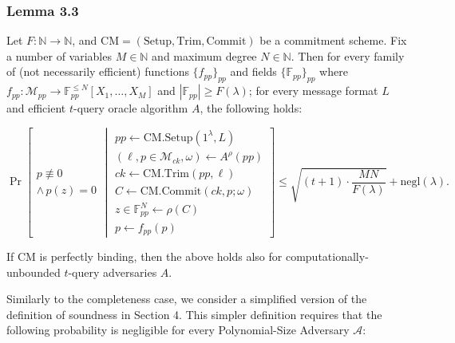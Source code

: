 \documentclass[
]{article}
\author{}
\date{2025-01-29 - 10:45:02 UTC}
\newcommand*\Ac{\mathcal{A}}
\begin{document}
\subsubsection{Lemma 3.3}\label{lemma-3.3}

Let \(F: \mathbb{N} \to \mathbb{N}\), and
\(\text{CM} = (\text{Setup}, \text{Trim}, \text{Commit})\) be a
commitment scheme. Fix a number of variables \(M \in \mathbb{N}\) and
maximum degree \(N \in \mathbb{N}\). Then for every family of (not
necessarily efficient) functions \(\{f_{pp}\}_{pp}\) and fields
\(\{\mathbb{F}_{pp}\}_{pp}\) where
\(f_{pp}: \mathcal{M}_{pp} \to \mathbb{F}^{\leq N}_{pp}[X_1, \ldots, X_M]\)
and \(|\mathbb{F}_{pp}| \geq F(\lambda)\); for every message format
\(L\) and efficient \(t\)-query oracle algorithm \(A\), the following
holds:

\[
\Pr\left[
\begin{array}{c}
p \not\equiv 0 \\
\land \, p(z) = 0
\end{array}
\middle|
\begin{array}{l}
pp \leftarrow \text{CM.Setup}(1^\lambda, L) \\
(\ell, p \in \mathcal{M}_{ck}, \omega) \leftarrow A^{\rho}(pp) \\
ck \leftarrow \text{CM.Trim}(pp, \ell) \\
C \leftarrow \text{CM.Commit}(ck, p; \omega) \\
z \in \mathbb{F}^{N}_{pp} \leftarrow \rho(C) \\
p \leftarrow f_{pp}(p)
\end{array}
\right]
\leq \sqrt{(t+1) \cdot \frac{MN}{F(\lambda)}} + \text{negl}(\lambda).
\]

If \(\text{CM}\) is perfectly binding, then the above holds also for
computationally-unbounded \(t\)-query adversaries \(A\).

Similarly to the completeness case, we consider a simplified version of
the definition of soundness in Section 4. This simpler definition
requires that the following probability is negligible for every
Polynomial-Size Adversary \(\Ac\):
\end{document}
